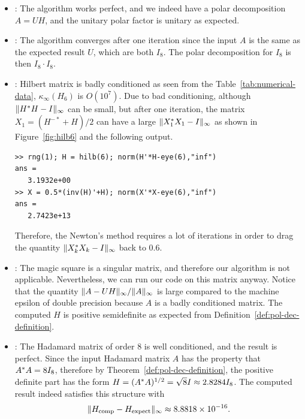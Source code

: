 \documentclass[12pt]{article}
\begin{document}
\begin{itemize}
    \item {}: The algorithm works perfect, and we indeed have a polar decomposition $A = UH$, and the unitary polar factor is unitary as expected. 
    \item {}: The algorithm converges after one iteration since the input $A$ is the same as the expected result $U$, which are both $I_8$. The polar decomposition for $I_8$ is then $I_8 \cdot I_8$.
    \item {}: Hilbert matrix is badly conditioned as seen from the Table~\ref{tab:numerical-data}, $\kappa_\infty(H_6)$ is $O(10^7)$. Due to bad conditioning, although $\|{H^* H - I}\|_{\infty}$ can be small, but after one iteration, the matrix $X_{1} = (H^{-*} + H)/2$ can have a large $\|{X_1^* X_1 - I}\|_{\infty}$ as shown in Figure~\ref{fig:hilb6} and the following output.
\begin{lstlisting}
>> rng(1); H = hilb(6); norm(H'*H-eye(6),"inf")
ans =
   3.1932e+00
>> X = 0.5*(inv(H)'+H); norm(X'*X-eye(6),"inf")
ans =
   2.7423e+13
\end{lstlisting}
Therefore, the Newton's method requires a lot of iterations in order to drag the quantity $\|{X_k^* X_k - I}\|_{\infty}$ back to $0.6$.
    \item {}: The magic square is a singular matrix, and therefore our algorithm is not applicable. Nevertheless, we can run our code on this matrix anyway. Notice that the quantity $\|{A-UH}\|_{\infty}/\|{A}\|_{\infty}$ is large compared to the machine epsilon of double precision because $A$ is a badly conditioned matrix. The computed $H$ is positive semidefinite as expected from Definition~\ref{def:pol-dec-definition}. 
    \item {}: The Hadamard matrix of order 8 is well conditioned, and the result is perfect. Since the input Hadamard matrix $A$ has the property that $A^* A = 8I_8$, therefore by Theorem~\ref{def:pol-dec-definition}, the positive definite part has the form $H = (A^* A)^{1/2} = \sqrt{8}I \approx 2.8284I_8$. The computed result indeed satisfies this structure with $$\|{H_\mathrm{comp} - H_\mathrm{expect}}\|_{\infty}\approx 8.8818\times 10^{-16}.$$ 
\end{itemize}
\end{document}
